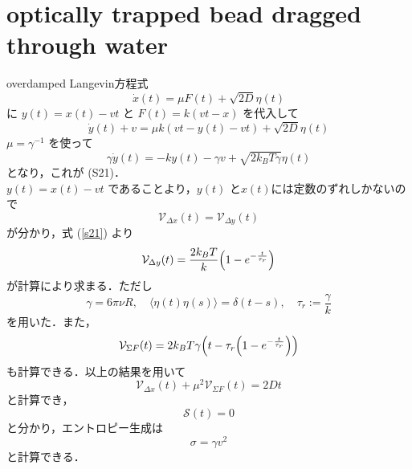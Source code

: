 \documentclass{jsarticle}
\numberwithin{equation}{section}
\theoremstyle{definition}
\begin{document}
\section{optically trapped bead dragged through water}
overdamped Langevin方程式 
\begin{equation}
  \dot{x} (t) = \mu F(t) + \sqrt{2D} \eta (t)
\end{equation}
に $y(t) = x(t) -vt$ と $F(t) = k(vt - x)$ を代入して
\begin{equation}
  \dot{y}(t) + v = \mu k (vt - y(t) - vt) + \sqrt{2D} \eta(t)
\end{equation}
$\mu = \gamma^{-1}$ を使って
\begin{equation}
  \label{s21}
  \gamma \dot{y} (t) = -k y(t) - \gamma v + \sqrt{2 k_B T \gamma } \eta(t)
\end{equation}
となり，これが (S21)．\\
$y(t) = x(t) -vt$ であることより，$y(t)$ と$x(t)$には定数のずれしかないので
\begin{equation}
  \mathcal{V}_{\Delta x} (t) = \mathcal{V}_{\Delta y} (t)
\end{equation}
が分かり，式 (\ref{s21}) より
\begin{equation}
  \mathcal{V}_{\Delta y} (t) = \frac{2 k_B T}{k} \qty( 1 - e^{-\frac{t}{\tau_r}} )
\end{equation}
が計算により求まる．ただし
\begin{equation}
  \gamma = 6 \pi \nu R, \quad \langle \eta(t) \eta(s) \rangle = \delta (t-s), \quad \tau_r := \frac{\gamma}{k}
\end{equation}
を用いた．また，
\begin{equation}
  \mathcal{V}_{\Sigma F} (t) = 2 k_B T \gamma \qty( t - \tau_r \qty( 1 - e^{-\frac{t}{\tau_r}} ) )
\end{equation}
も計算できる．以上の結果を用いて
\begin{equation}
  \mathcal{V}_{\Delta x} (t) + \mu^2 \mathcal{V}_{\Sigma F} (t) = 2Dt 
\end{equation}
と計算でき，
\begin{equation}
  \mathcal{S} (t) = 0 
\end{equation}
と分かり，エントロピー生成は
\begin{equation}
  \sigma = \gamma v^2
\end{equation}
と計算できる．
\end{document}
